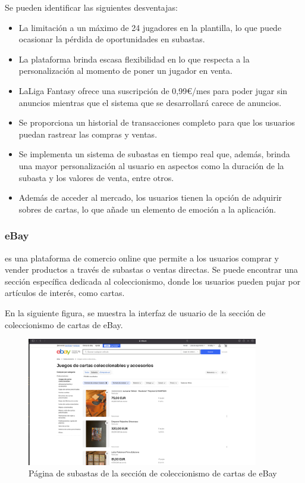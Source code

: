 Se pueden identificar las siguientes desventajas:
\begin{itemize}
    \item La limitación a un máximo de 24 jugadores en la plantilla, lo que puede ocasionar la pérdida de oportunidades en subastas.
    \item La plataforma brinda escasa flexibilidad en lo que respecta a la personalización al momento de poner un jugador en venta.
\end{itemize}

\begin{itemize}
    \item LaLiga Fantasy ofrece una suscripción de 0,99€/mes para poder jugar sin anuncios mientras que el sistema que se desarrollará carece de anuncios.
    \item Se proporciona un historial de transacciones completo para que los usuarios puedan rastrear las compras y ventas.
    \item Se implementa un sistema de subastas en tiempo real que, además, brinda una mayor personalización al usuario en aspectos como la duración de la subasta y los valores de venta, entre otros.
    \item Además de acceder al mercado, los usuarios tienen la opción de adquirir sobres de cartas, lo que añade un elemento de emoción a la aplicación.
\end{itemize}

\subsubsection{eBay}
 es una plataforma de comercio online que permite a los usuarios comprar y vender productos a través de subastas o ventas directas. Se puede encontrar una sección específica dedicada al coleccionismo, donde los usuarios pueden pujar por artículos de interés, como cartas.

En la siguiente figura, se muestra la interfaz de usuario de la sección de coleccionismo de cartas de eBay.
\begin{figure}[H]
    \centering
    \includegraphics[width=0.9\textwidth]{figures/4-Estudio-viabilidad/4_Ebay.png}
    \caption{Página de subastas de la sección de coleccionismo de cartas de eBay}
    \label{fig:ebay}
    \hypertarget{fig:ebay}{}
\end{figure} 

